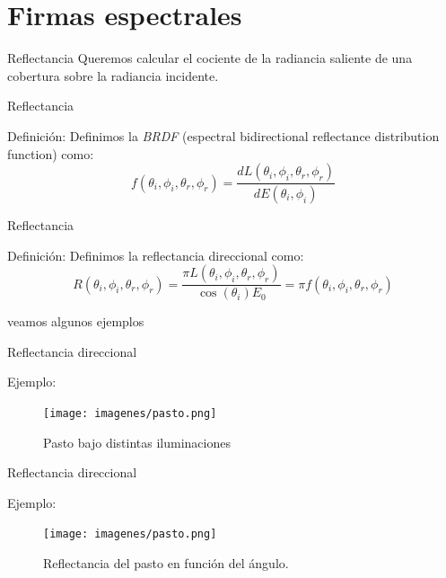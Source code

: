 \documentclass[]{beamer}
\begin{document}
\section{Firmas espectrales}
\begin{frame}{Reflectancia}
  Queremos calcular el cociente de la radiancia saliente de una cobertura sobre la radiancia incidente.
\end{frame}

\begin{frame}{Reflectancia}
  \begin{block}{Definición:}
    Definimos la \emph{BRDF} (espectral bidirectional reflectance distribution function) como:
    $$ f(\theta_i, \phi_i, \theta_r, \phi_r) = \frac{dL(\theta_i, \phi_i, \theta_r, \phi_r)}{dE(\theta_i, \phi_i)}$$
  \end{block}
\end{frame}

\begin{frame}{Reflectancia}
  \begin{block}{Definición:}
    Definimos la reflectancia direccional como:
    $$ R(\theta_i, \phi_i, \theta_r, \phi_r) = \frac{\pi L(\theta_i, \phi_i, \theta_r, \phi_r)}{\cos(\theta_i) E_0} = \pi f(\theta_i, \phi_i, \theta_r, \phi_r)$$
  \end{block}
  veamos algunos ejemplos
\end{frame}

\begin{frame}{Reflectancia direccional}
  \begin{exampleblock}{Ejemplo:}
    \begin{figure}
      \texttt{[image: imagenes/pasto.png]}
      \caption{Pasto bajo distintas iluminaciones}
    \end{figure}
  \end{exampleblock}
\end{frame}

\begin{frame}{Reflectancia direccional}
  \begin{exampleblock}{Ejemplo:}
    \begin{figure}
      \texttt{[image: imagenes/pasto.png]}
      \caption{Reflectancia del pasto en función del ángulo.}
    \end{figure}
  \end{exampleblock}
\end{frame}
\end{document}
